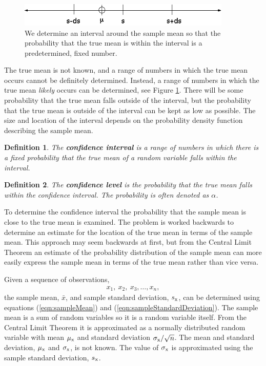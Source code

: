\documentclass[12pt]{article}
\newtheorem{definition}{Definition}[section]
\begin{document}
\begin{figure}[tb]
  \centerline{\includegraphics[width=4in]{confidence}}
  \caption{We determine an interval around the sample mean so that the
    probability that the true mean is within the interval is a
    predetermined, fixed number.}
  \label{fig:confidenceInterval}
\end{figure}


The true mean is not known, and a range of numbers in which the true
mean occurs cannot be definitely determined. Instead, a range of
numbers in which the true mean \textit{likely} occurs can be
determined, see Figure \ref{fig:confidenceInterval}.  There will be
some probability that the true mean falls outside of the interval, but
the probability that the true mean is outside of the interval can be
kept as low as possible. The size and location of the interval depends
on the probability density function describing the sample mean.

\begin{definition}
  The \textbf{confidence interval} is a range of numbers in which
  there is a fixed probability that the true mean of a random variable
  falls within the interval.
\end{definition}

\begin{definition}
  The \textbf{confidence level} is the probability that the true mean
  falls within the confidence interval. The probability is often
  denoted as $\alpha$.
\end{definition}

To determine the confidence interval the probability that the sample
mean is close to the true mean is examined. The problem is worked
backwards to determine an estimate for the location of the true mean
in terms of the sample mean. This approach may seem backwards at
first, but from the Central Limit Theorem an estimate of the
probability distribution of the sample mean can more easily express
the sample mean in terms of the true mean rather than vice versa.

Given a sequence of observations,
\begin{eqnarray*}
  x_1,~x_2,~x_3,\ldots,x_n,
\end{eqnarray*}
the sample mean, $\bar{x}$, and sample standard deviation, $s_{\rm
  x}$, can be determined using equations (\ref{eqn:sampleMean}) and
(\ref{eqn:sampleStandardDeviation}). The sample mean is a sum of
random variables so it is a random variable itself. From the Central
Limit Theorem it is approximated as a normally distributed random
variable with mean $\mu_{\rm x}$ and standard deviation $\sigma_{\rm
  x}/\sqrt{n}$.  The mean and standard deviation, $\mu_{\rm x}$ and
$\sigma_{\rm x}$, is not known. The value of $\sigma_{\rm x}$ is
approximated using the sample standard deviation, $s_{\rm x}$.
\end{document}
